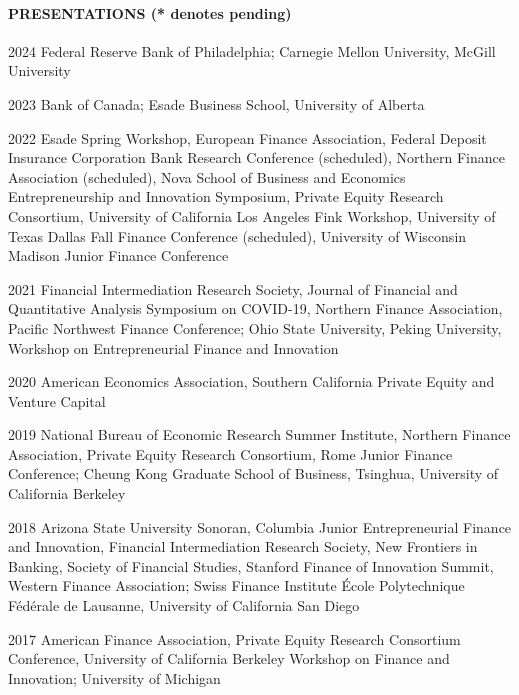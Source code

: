 \documentclass[11pt]{article}
\begin{document}
\paragraph{PRESENTATIONS (* denotes pending)}
\begin{datelist}
    \item[2024] Federal Reserve Bank of Philadelphia; Carnegie Mellon University, McGill University

    \item[2023] Bank of Canada; Esade Business School, University of Alberta

    \item[2022] Esade Spring Workshop, European Finance Association, Federal Deposit Insurance Corporation Bank Research Conference (scheduled), Northern Finance Association (scheduled), Nova School of Business and Economics Entrepreneurship and Innovation Symposium, Private Equity Research Consortium, University of California Los Angeles Fink Workshop, University of Texas Dallas Fall Finance Conference (scheduled), University of Wisconsin Madison Junior Finance Conference

    \item[2021] Financial Intermediation Research Society, Journal of Financial and Quantitative Analysis Symposium on COVID-19, Northern Finance Association, Pacific Northwest Finance Conference; Ohio State University, Peking University, Workshop on Entrepreneurial Finance and Innovation

    \item[2020] American Economics Association, Southern California Private Equity and Venture Capital

    \item[2019] National Bureau of Economic Research Summer Institute, Northern Finance Association, Private Equity Research Consortium, Rome Junior Finance Conference; Cheung Kong Graduate School of Business, Tsinghua, University of California Berkeley

    \item[2018] Arizona State University Sonoran, Columbia Junior Entrepreneurial Finance and Innovation, Financial Intermediation Research Society, New Frontiers in Banking, Society of Financial Studies, Stanford Finance of Innovation Summit, Western Finance Association; Swiss Finance Institute École Polytechnique Fédérale de Lausanne, University of California San Diego

    \item[2017] American Finance Association, Private Equity Research Consortium Conference, University of California Berkeley Workshop on Finance and Innovation; University of Michigan


\end{datelist}
\end{document}

